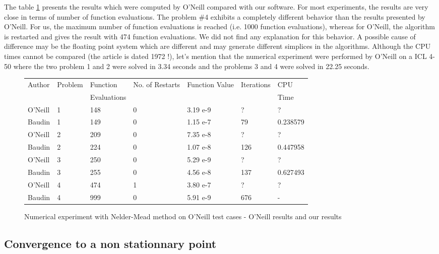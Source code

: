 The table \ref{fig-nm-oneill-table} presents the results which were 
computed by O'Neill compared with our software.
For most experiments, the results are very close in terms of 
number of function evaluations. 
The problem \#4 exhibits a completely different behavior than the 
results presented by O'Neill. For us, the maximum number of function evaluations
is reached (i.e. 1000 function evaluations), whereas for O'Neill, the algorithm 
is restarted and gives the result with 474 function evaluations. 
We did not find any explanation for this behavior. A possible cause of 
difference may be the floating point system which are different and may 
generate different simplices in the algorithms.
Although the CPU times cannot be 
compared (the article is dated 1972 !), let's mention 
that the numerical experiment were performed by O'Neill
on a ICL 4-50 where the two problem 1 and 2 were solved in 3.34 seconds
and the problems 3 and 4 were solved in 22.25 seconds.


\begin{figure}[htbp]
\begin{center}
\begin{tabular}{|l|l|l|l|l|l|l|}
\hline
Author & Problem & Function & No. of Restarts & Function Value & Iterations & CPU\\
& & Evaluations & & & & Time \\
\hline
O'Neill & 1 & 148 & 0 & 3.19 e-9 & ? & ? \\
Baudin & 1 & 149 & 0 & 1.15 e-7 & 79 & 0.238579 \\
\hline
O'Neill & 2 & 209 & 0 & 7.35 e-8 & ? & ?  \\
Baudin & 2 & 224 & 0 & 1.07 e-8 & 126 & 0.447958 \\
\hline
O'Neill & 3 & 250 & 0 & 5.29 e-9 & ? & ? \\
Baudin & 3 & 255 & 0 & 4.56 e-8 & 137 & 0.627493 \\
\hline
O'Neill & 4 & 474 & 1 & 3.80 e-7 & ? & ? \\
Baudin & 4 & 999 & 0 & 5.91 e-9 & 676 & - \\
\hline
\end{tabular}
\end{center}
\caption{Numerical experiment with Nelder-Mead method on O'Neill test cases - O'Neill results and our results}
\label{fig-nm-oneill-table}
\end{figure}

\subsection{Convergence to a non stationnary point}
\label{section-mcKinnon}

